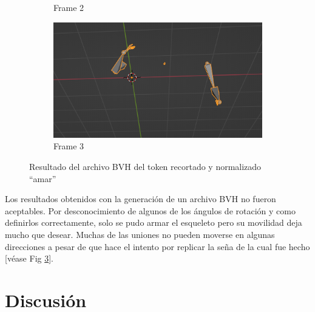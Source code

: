 \begin{figure}[t]
\begin{subfigure}[t]{0.3\textwidth}
		\caption{Frame 2}
		\label{f:bframe2}
	\end{subfigure}
	\begin{subfigure}[t]{0.3\textwidth}
		\centering
		\includegraphics[align=t,width=0.9\linewidth, height =0.9\linewidth]{Graphics/blender_bvh_4.png}
		\caption{Frame 3}
		\label{f:bframe3}
	\end{subfigure}
	
	\caption{Resultado del archivo BVH del token recortado y normalizado ``amar''}
	\label{f:amar_bvh}
\end{figure}
Los resultados obtenidos con la generación de un archivo BVH no fueron aceptables. Por desconocimiento de algunos de los ángulos de rotación y como definirlos correctamente, solo se pudo armar el esqueleto pero su movilidad deja mucho que desear. Muchas de las uniones no pueden moverse en algunas direcciones a pesar de que hace el intento por replicar la seña de la cual fue hecho [véase Fig \ref{f:amar_bvh}].

\section{Discusión}

